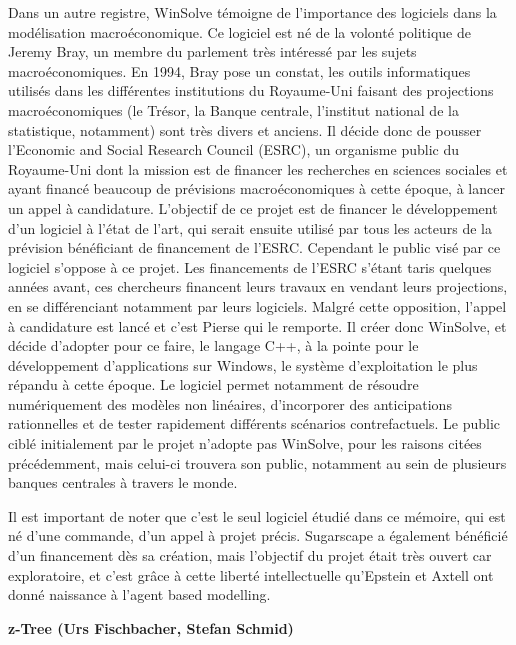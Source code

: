 Dans un autre registre, WinSolve témoigne de l’importance des logiciels dans la modélisation macroéconomique. Ce logiciel est né de la volonté politique de Jeremy Bray, un membre du parlement très intéressé par les sujets macroéconomiques. En 1994, Bray pose un constat, les outils informatiques utilisés dans les différentes institutions du Royaume-Uni faisant des projections macroéconomiques (le Trésor, la Banque centrale, l'institut national de la statistique, notamment) sont très divers et anciens. Il décide donc de pousser l'Economic and Social Research Council (ESRC), un organisme public du Royaume-Uni dont la mission est de financer les recherches en sciences sociales et ayant financé beaucoup de prévisions macroéconomiques à cette époque, à lancer un appel à candidature. L'objectif de ce projet est de financer le développement d'un logiciel à l'état de l'art, qui serait ensuite utilisé par tous les acteurs de la prévision bénéficiant de financement de l'ESRC. Cependant le public visé par ce logiciel s'oppose à ce projet. Les financements de l'ESRC s'étant taris quelques années avant, ces chercheurs financent leurs travaux en vendant leurs projections, en se différenciant notamment par leurs logiciels. Malgré cette opposition, l'appel à candidature est lancé et c'est Pierse qui le remporte. Il créer donc WinSolve, et décide d'adopter pour ce faire, le langage C++, à la pointe pour le développement d'applications sur Windows, le système d'exploitation le plus répandu à cette époque. Le logiciel permet notamment de résoudre numériquement des modèles non linéaires, d’incorporer des anticipations rationnelles et de tester rapidement différents scénarios contrefactuels. Le public ciblé initialement par le projet n'adopte pas WinSolve, pour les raisons citées précédemment, mais celui-ci trouvera son public, notamment au sein de plusieurs banques centrales à travers le monde.

Il est important de noter que c'est le seul logiciel étudié dans ce mémoire, qui est né d'une commande, d'un appel à projet précis. Sugarscape a également bénéficié d'un financement dès sa création, mais l'objectif du projet était très ouvert car exploratoire, et c'est grâce à cette liberté intellectuelle qu'Epstein et Axtell ont donné naissance à l'agent based modelling.



\textbf{z-Tree (Urs Fischbacher, Stefan Schmid)}

